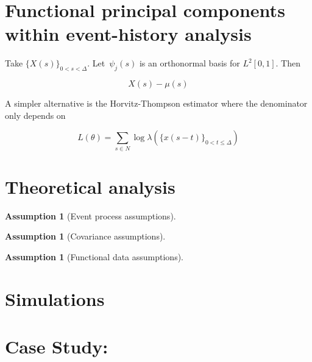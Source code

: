 \documentclass[11pt]{amsart}
\newtheorem{assumption}[thm]{Assumption}
\begin{document}
\section{Functional principal components within event-history
  analysis}

Take $\{ X (s) \}_{0 < s < \Delta}$. Let~$\psi_{j} (s)$ is an
orthonormal basis for $L^2 [ 0,1 ]$.  Then

\[
X(s) - \mu(s) 
\]

A simpler alternative is the Horvitz-Thompson estimator where the
denominator only depends on 

\[
L(\theta) = \sum_{s \in N} \log \lambda \left( \{ x(s-t) \}_{0 < t
    \leq \Delta} \right) 
\]



\section{Theoretical analysis}

\begin{assumption}[Event process assumptions]

\end{assumption}

\begin{assumption}[Covariance assumptions]

\end{assumption}

\begin{assumption}[Functional data assumptions]

\end{assumption}



\section{Simulations}

\subsection{}

\section{Case Study: }



\end{document}
